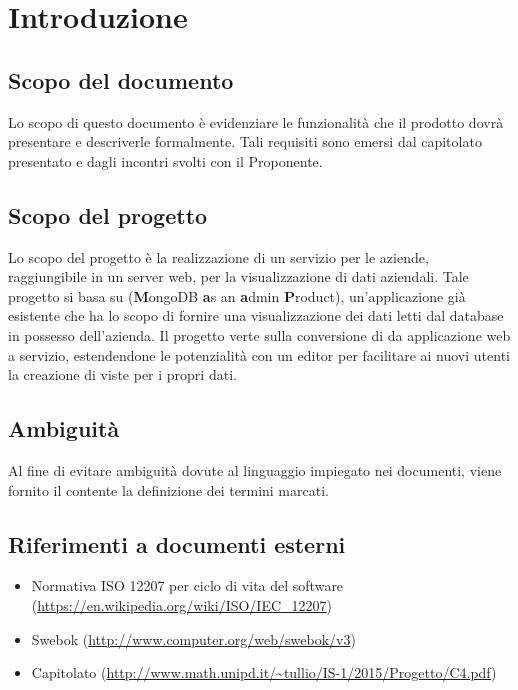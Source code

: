 \section{Introduzione}
\subsection{Scopo del documento}
Lo scopo di questo documento è evidenziare le funzionalit\`a che il prodotto dovr\`a presentare e descriverle formalmente. Tali requisiti sono emersi dal capitolato presentato e dagli incontri svolti con il Proponente.

\subsection{Scopo del progetto}
Lo scopo del progetto è la realizzazione di un servizio per le aziende, raggiungibile in un server web, per la visualizzazione di dati aziendali. Tale progetto si basa su  (\textbf{M}ongoDB \textbf{a}s an \textbf{a}dmin \textbf{P}roduct), un'applicazione già esistente che ha lo scopo di fornire una visualizzazione dei dati letti dal database  in possesso dell'azienda. Il progetto verte sulla conversione di  da applicazione web a servizio, estendendone le potenzialità con un editor per facilitare ai nuovi utenti la creazione di viste per i propri dati.

\subsection{Ambiguit\`a} 
Al fine di evitare ambiguità dovute al linguaggio impiegato nei documenti, viene fornito il \Glossario contente la definizione dei termini marcati.

\subsection{Riferimenti a documenti esterni}
\begin{itemize}
\item Normativa ISO 12207 per ciclo di vita del software (\url{https://en.wikipedia.org/wiki/ISO/IEC_12207})
\item Swebok (\url{http://www.computer.org/web/swebok/v3})
\item Capitolato (\url{http://www.math.unipd.it/~tullio/IS-1/2015/Progetto/C4.pdf})
\end{itemize}

